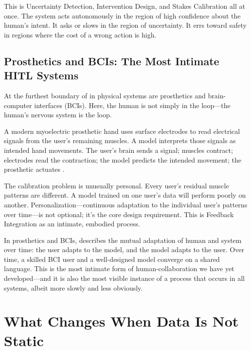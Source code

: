 This is Uncertainty Detection, Intervention Design, and Stakes Calibration all at once. The system acts autonomously in the region of high confidence about the human's intent. It asks or slows in the region of uncertainty. It errs toward safety in regions where the cost of a wrong action is high.

\subsection{Prosthetics and BCIs: The Most Intimate HITL Systems}

At the furthest boundary of \hitl in physical systems are prosthetics and brain-computer interfaces (BCIs). Here, the human is not simply in the loop---the human's nervous system is the loop.

A modern myoelectric prosthetic hand uses surface electrodes to read electrical signals from the user's remaining muscles. A \ml model interprets those signals as intended hand movements. The user's brain sends a signal; muscles contract; electrodes read the contraction; the model predicts the intended movement; the prosthetic actuates \autocite{farina2014emg}.

The calibration problem is unusually personal. Every user's residual muscle patterns are different. A model trained on one user's data will perform poorly on another. Personalization---continuous adaptation to the individual user's patterns over time---is not optional; it's the core design requirement. This is Feedback Integration as an intimate, embodied process.

\begin{keyconcept}[Co-Adaptation]
In prosthetics and BCIs,  describes the mutual adaptation of human and \ai system over time: the user adapts to the model, and the model adapts to the user. Over time, a skilled BCI user and a well-designed model converge on a shared language. This is the most intimate form of human-\ai collaboration we have yet developed---and it is also the most visible instance of a process that occurs in all \hitl systems, albeit more slowly and less obviously.
\end{keyconcept}

\section{What Changes When Data Is Not Static}
\label{sec:not-static}


